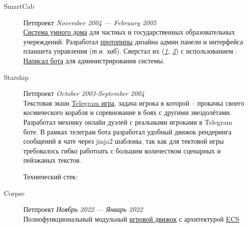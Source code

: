 \documentclass[margin,line]{resume}
\begin{document}
\begin{resume}
\begin{description}
  \item[SmartCab]\small{Петпроект \hfill
    \textsl{November 2004 — February 2005}}\\
    \href{https://github.com/smart-cab}{Система умного дома} для
    частных и государственных образовательных учереждений. Разработал
    \href{https://www.figma.com/design/8H1tFpxgmIDV1xp06ndi73/SmartCab?node-id=0-1&p=f}{протопипы}
    дизайна админ панели и интерфейса планшета управления
    (\textit{т.н. хаб}). Сверстал их
    (\textit{\href{https://github.com/smart-cab/smartcab-hub/tree/main/frontend}{1},
    \href{https://github.com/smart-cab/smartcab-dashboard/tree/main/frontend}{2}})
    с использованием .
    \href{https://github.com/smart-cab/smartcab-bot}{Написал бота}
    для администрирования системы.

    \vspace{3mm}

  \item[Starship]\small{Петпроект
    \hfill \textsl{October 2003-September 2004\vspace{2mm}}}\\
    Текстовая экшн \href{https://github.com/starship-crew}{Telegram
    игра}, задача игрока в которой – прокачка своего космического
    корабля и соревнование в боях с другими звездолётами. Разработал
    мехнику онлайн дуэлей с реальными игроками в Telegram боте. В
    рамках телеграм бота разработал удобный движок рендеринга
    сообщений в чате через jinja2 шаблоны, так как для тектовой игры
    требовалось гибко работоать с большим количеством сценарных и
    пейзжаных текстов.

    Технический стек:

    \vspace{3mm}

  \item[Corpse]\small{Петпроект
    \hfill \textsl{Ноябрь 2022 — Январь 2022\vspace{2mm}}}\\
    Полнофункциональный модульный
    \href{https://github.com/corpse-inc/corpse}{игровой движок} с
    архитектурой
    \href{https://en.wikipedia.org/wiki/Entity_component_system#:~:text=Entity%E2%80%93component%E2%80%93system%20(ECS,Entity%E2%80%93Component%E2%80%93System%20layout.}{ECS}


\end{description}
\end{resume}
\end{document}
